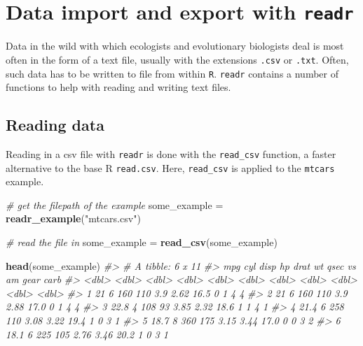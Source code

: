 \documentclass[]{book}
\newenvironment{Shaded}{}{}
\newcommand{\CommentTok}[1]{\textcolor[rgb]{0.38,0.63,0.69}{\textit{#1}}}
\newcommand{\KeywordTok}[1]{\textcolor[rgb]{0.00,0.44,0.13}{\textbf{#1}}}
\newcommand{\NormalTok}[1]{#1}
\newcommand{\StringTok}[1]{\textcolor[rgb]{0.25,0.44,0.63}{#1}}
\begin{document}
\hypertarget{data-import-and-export-with-readr}{%
\section{\texorpdfstring{Data import and export with \texttt{readr}}{Data import and export with readr}}\label{data-import-and-export-with-readr}}

Data in the wild with which ecologists and evolutionary biologists deal is most often in the form of a text file, usually with the extensions \texttt{.csv} or \texttt{.txt}. Often, such data has to be written to file from within \texttt{R}. \texttt{readr} contains a number of functions to help with reading and writing text files.

\hypertarget{reading-data}{%
\subsection{Reading data}\label{reading-data}}

Reading in a csv file with \texttt{readr} is done with the \texttt{read\_csv} function, a faster alternative to the base R \texttt{read.csv}. Here, \texttt{read\_csv} is applied to the \texttt{mtcars} example.

\begin{Shaded}
\begin{Highlighting}[]
\CommentTok{# get the filepath of the example}
\NormalTok{some_example =}\StringTok{ }\KeywordTok{readr_example}\NormalTok{(}\StringTok{"mtcars.csv"}\NormalTok{)}

\CommentTok{# read the file in}
\NormalTok{some_example =}\StringTok{ }\KeywordTok{read_csv}\NormalTok{(some_example)}

\KeywordTok{head}\NormalTok{(some_example)}
\CommentTok{#> # A tibble: 6 x 11}
\CommentTok{#>     mpg   cyl  disp    hp  drat    wt  qsec    vs    am  gear  carb}
\CommentTok{#>   <dbl> <dbl> <dbl> <dbl> <dbl> <dbl> <dbl> <dbl> <dbl> <dbl> <dbl>}
\CommentTok{#> 1  21       6   160   110  3.9   2.62  16.5     0     1     4     4}
\CommentTok{#> 2  21       6   160   110  3.9   2.88  17.0     0     1     4     4}
\CommentTok{#> 3  22.8     4   108    93  3.85  2.32  18.6     1     1     4     1}
\CommentTok{#> 4  21.4     6   258   110  3.08  3.22  19.4     1     0     3     1}
\CommentTok{#> 5  18.7     8   360   175  3.15  3.44  17.0     0     0     3     2}
\CommentTok{#> 6  18.1     6   225   105  2.76  3.46  20.2     1     0     3     1}
\end{Highlighting}
\end{Shaded}
\end{document}
